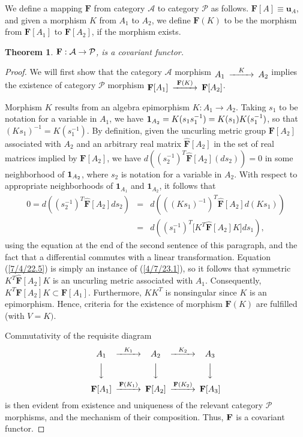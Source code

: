 \documentclass{amsart}
\numberwithin{equation}{section}
\newtheorem{theorem}{Theorem}
\theoremstyle{definition}
\numberwithin{theorem}{section}
\begin{document}
We define a mapping $\mathbf{F}$ from category $\mathcal{A}$ to category $\mathcal{P}$ as follows.  $\mathbf{F}[
A] \equiv \mathbf{u}_A$, and given a morphism $K$ from $A_1$ to $A_2$, we define $\mathbf{F}(K)$ to be the morphism from $\mathbf{F}[A_1]$ to $\mathbf{F}[A_2]$, if the morphism exists.   

\begin{theorem}\label{6/13/22.1}  ${\bf F}: \mathcal{A}\rightarrow \mathcal{P}$, is a covariant functor. 
 \end{theorem}
 \begin{proof}
We will first show that the category $\mathcal{A}$ morphism $ \begin{CD}  A_1 @>K>> A_2\end{CD}$ implies the existence of category $\mathcal{P}$ morphism $ \begin{CD}  {\bf F}[A_1] @>{\bf F}(K)>> {\bf F}[A_2]\end{CD}$.

Morphism $K$ results from an algebra epimorphism $K:A_1\rightarrow A_2$.   Taking $s_1$ to be notation for a variable in $A_1$, we have ${\bf 1}_{A_2} = K(s_1s_1^{-1}) = K(s_1)K(s_1^{-1})$, so that $(Ks_1)^{-1} = K(s_1^{-1})$.  By definition, given the uncurling metric group $\mathbf{F}[A_2]$ associated with $A_2$ and an arbitrary real matrix  $\hat{\mathbf{F}}[A_2]$ in the set of real matrices implied by $\mathbf{F}[A_2]$, we have $d\left((s_2^{-1})^T\hat{\mathbf{F}}[A_2] (ds_2)\right) = 0$ in some neighborhood of ${\bf 1}_{A_2}$, where $s_2$ is notation for a variable in $A_2$.   With respect to appropriate neighborhoods of $\mathbf{1}_{A_1}$ and $\mathbf{1}_{A_2}$, it follows that \begin{eqnarray}\nonumber 0 = d\left((s_2^{-1})^T\hat{\mathbf{F}}[A_2] ds_2\right) &=&  d\left(((Ks_1)^{-1})^T\hat{\mathbf{F}}[A_2] d(Ks_1)\right) \\  &=& d\left((s_1^{-1})^T \big[K^T \hat{\mathbf{F}}[A_2]K\big]ds_1\right), \label{7/4/22.5}  \end{eqnarray}   using the equation at the end of the second sentence of this paragraph, and the fact that a differential commutes with a linear transformation.  Equation (\ref{7/4/22.5}) is simply an instance of (\ref{4/7/23.1}), so it follows that symmetric $K^T \hat{\mathbf{F}}[A_2]K$ is an uncurling metric associated with $A_1$.  Consequently, $K^T\mathbf{F}[A_2]K\subset \mathbf{F}[A_1]$.  Furthermore, $KK^T$ is nonsingular since $K$ is an epimorphism.  Hence, criteria for the existence of morphism $\mathbf{F}(K)$ are fulfilled (with $V=K)$.

Commutativity of the requisite diagram
  \[  \begin{CD}  
A_1 @>K_1>> A_2 @>K_2>> A_3\\
 @VVV   @VVV  @VVV\\
 {\bf F}[A_1]   @>{\bf F}(K_1)>>  {\bf F}[A_2]  @>{\bf F}(K_2)>>  {\bf F}[A_3] \\ 
 \end{CD} \]
is then evident from existence and uniqueness of the relevant category $\mathcal{P}$ morphisms, and the mechanism of their composition.  Thus, ${\bf F}$ is a covariant functor. 
\end{proof}
\end{document}
